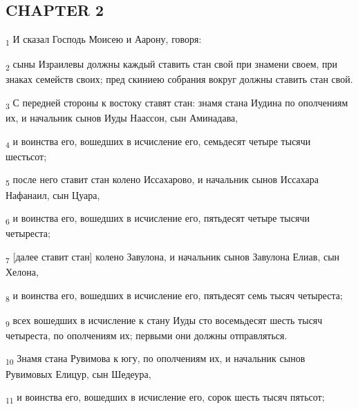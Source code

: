 \subsection{CHAPTER 2}
\begin{tcolorbox}
\textsubscript{1} И сказал Господь Моисею и Аарону, говоря:
\end{tcolorbox}
\begin{tcolorbox}
\textsubscript{2} сыны Израилевы должны каждый ставить стан свой при знамени своем, при знаках семейств своих; пред скиниею собрания вокруг должны ставить стан свой.
\end{tcolorbox}
\begin{tcolorbox}
\textsubscript{3} С передней стороны к востоку ставят стан: знамя стана Иудина по ополчениям их, и начальник сынов Иуды Наассон, сын Аминадава,
\end{tcolorbox}
\begin{tcolorbox}
\textsubscript{4} и воинства его, вошедших в исчисление его, семьдесят четыре тысячи шестьсот;
\end{tcolorbox}
\begin{tcolorbox}
\textsubscript{5} после него ставит стан колено Иссахарово, и начальник сынов Иссахара Нафанаил, сын Цуара,
\end{tcolorbox}
\begin{tcolorbox}
\textsubscript{6} и воинства его, вошедших в исчисление его, пятьдесят четыре тысячи четыреста;
\end{tcolorbox}
\begin{tcolorbox}
\textsubscript{7} [далее ставит стан] колено Завулона, и начальник сынов Завулона Елиав, сын Хелона,
\end{tcolorbox}
\begin{tcolorbox}
\textsubscript{8} и воинства его, вошедших в исчисление его, пятьдесят семь тысяч четыреста;
\end{tcolorbox}
\begin{tcolorbox}
\textsubscript{9} всех вошедших в исчисление к стану Иуды сто восемьдесят шесть тысяч четыреста, по ополчениям их; первыми они должны отправляться.
\end{tcolorbox}
\begin{tcolorbox}
\textsubscript{10} Знамя стана Рувимова к югу, по ополчениям их, и начальник сынов Рувимовых Елицур, сын Шедеура,
\end{tcolorbox}
\begin{tcolorbox}
\textsubscript{11} и воинства его, вошедших в исчисление его, сорок шесть тысяч пятьсот;
\end{tcolorbox}
